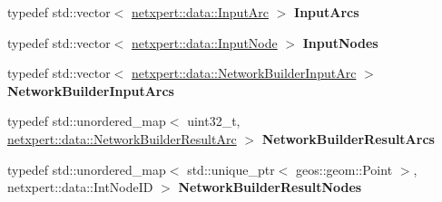 \begin{DoxyCompactItemize}
\item 
typedef std\+::vector$<$ \hyperlink{structnetxpert_1_1data_1_1InputArc}{netxpert\+::data\+::\+Input\+Arc} $>$ {\bfseries Input\+Arcs}\hypertarget{namespacenetxpert_1_1data_a622e9894c04df58e343def1d46f8a3b0}{}\label{namespacenetxpert_1_1data_a622e9894c04df58e343def1d46f8a3b0}

\item 
typedef std\+::vector$<$ \hyperlink{structnetxpert_1_1data_1_1InputNode}{netxpert\+::data\+::\+Input\+Node} $>$ {\bfseries Input\+Nodes}\hypertarget{namespacenetxpert_1_1data_a94f8201b53f3f360d76cb382c10d4aaa}{}\label{namespacenetxpert_1_1data_a94f8201b53f3f360d76cb382c10d4aaa}

\item 
typedef std\+::vector$<$ \hyperlink{structnetxpert_1_1data_1_1NetworkBuilderInputArc}{netxpert\+::data\+::\+Network\+Builder\+Input\+Arc} $>$ {\bfseries Network\+Builder\+Input\+Arcs}\hypertarget{namespacenetxpert_1_1data_a4ce65cc733f5a4f03be3d5bc641e7803}{}\label{namespacenetxpert_1_1data_a4ce65cc733f5a4f03be3d5bc641e7803}

\item 
typedef std\+::unordered\+\_\+map$<$ uint32\+\_\+t, \hyperlink{structnetxpert_1_1data_1_1NetworkBuilderResultArc}{netxpert\+::data\+::\+Network\+Builder\+Result\+Arc} $>$ {\bfseries Network\+Builder\+Result\+Arcs}\hypertarget{namespacenetxpert_1_1data_a3d430c470458654a6c8b6300f20745d1}{}\label{namespacenetxpert_1_1data_a3d430c470458654a6c8b6300f20745d1}

\item 
typedef std\+::unordered\+\_\+map$<$ std\+::unique\+\_\+ptr$<$ geos\+::geom\+::\+Point $>$, netxpert\+::data\+::\+Int\+Node\+ID $>$ {\bfseries Network\+Builder\+Result\+Nodes}\hypertarget{namespacenetxpert_1_1data_a9aee1a4198675b12b95219f98e651e9c}{}\label{namespacenetxpert_1_1data_a9aee1a4198675b12b95219f98e651e9c}

\end{DoxyCompactItemize}
